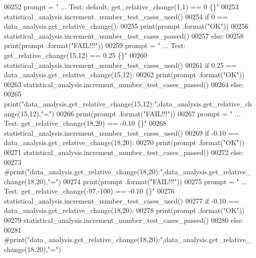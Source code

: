 \begin{DoxyCode}
00252         prompt = \textcolor{stringliteral}{"  ... Test: default, get\_relative\_change(1,1) == 0    \{\}"}
00253         statistical\_analysis.increment\_number\_test\_cases\_used()
00254         \textcolor{keywordflow}{if} 0 == data\_analysis.get\_relative\_change():
00255             print(prompt .format(\textcolor{stringliteral}{"OK"}))
00256             statistical\_analysis.increment\_number\_test\_cases\_passed()
00257         \textcolor{keywordflow}{else}:
00258             print(prompt .format(\textcolor{stringliteral}{"FAIL!!!"}))
00259         prompt = \textcolor{stringliteral}{"  ... Test: get\_relative\_change(15,12) == 0.25        \{\}"}
00260         statistical\_analysis.increment\_number\_test\_cases\_used()
00261         \textcolor{keywordflow}{if} 0.25 == data\_analysis.get\_relative\_change(15,12):
00262             print(prompt .format(\textcolor{stringliteral}{"OK"}))
00263             statistical\_analysis.increment\_number\_test\_cases\_passed()
00264         \textcolor{keywordflow}{else}:
00265             print(\textcolor{stringliteral}{"data\_analysis.get\_relative\_change(15,12):"},data\_analysis.get\_relative\_change(15,12),\textcolor{stringliteral}{"="})
00266             print(prompt .format(\textcolor{stringliteral}{"FAIL!!!"}))
00267         prompt = \textcolor{stringliteral}{"  ... Test: get\_relative\_change(18,20) == -0.10       \{\}"}
00268         statistical\_analysis.increment\_number\_test\_cases\_used()
00269         \textcolor{keywordflow}{if} -0.10 == data\_analysis.get\_relative\_change(18,20):
00270             print(prompt .format(\textcolor{stringliteral}{"OK"}))
00271             statistical\_analysis.increment\_number\_test\_cases\_passed()
00272         \textcolor{keywordflow}{else}:
00273             \textcolor{comment}{
      #print("data\_analysis.get\_relative\_change(18,20):",data\_analysis.get\_relative\_change(18,20),"=")}
00274             print(prompt .format(\textcolor{stringliteral}{"FAIL!!!"}))
00275         prompt = \textcolor{stringliteral}{"  ... Test: get\_relative\_change(-97,-100) == -0.10        \{\}"}
00276         statistical\_analysis.increment\_number\_test\_cases\_used()
00277         \textcolor{keywordflow}{if} -0.10 == data\_analysis.get\_relative\_change(18,20):
00278             print(prompt .format(\textcolor{stringliteral}{"OK"}))
00279             statistical\_analysis.increment\_number\_test\_cases\_passed()
00280         \textcolor{keywordflow}{else}:
00281             \textcolor{comment}{
      #print("data\_analysis.get\_relative\_change(18,20):",data\_analysis.get\_relative\_change(18,20),"=")}

\end{DoxyCode}
